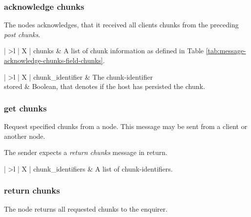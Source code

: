 \subsubsection{acknowledge chunks}
The \glspl{node} acknowledges, that it received all \glspl{client} \glspl{chunk} from the preceding \emph{post chunks}.

\begin{table}[h!]
    \begin{tabu}{| >{\ttfamily}l | X |}
        chunks
            & A list of \gls{chunk} information as defined in Table \ref{tab:message-acknowledge-chunks-field-chunks}.
    \end{tabu}
    \caption[\emph{acknowledge chunks} Structure]{Structure of a \emph{acknowledge chunks} \Gls{message}.}
    \label{tab:message-acknowledge-chunks-states}
\end{table}

\begin{table}[h!]
    \begin{tabu}{| >{\ttfamily}l | X |}
        chunk\_identifier
            & The \gls{chunk-identifier} \\
        stored
            & Boolean, that denotes if the host has persisted the \gls{chunk}.
    \end{tabu}
    \caption[Field \texttt{chunks} Structure]{Structure of Field \texttt{chunks} as Used in the \emph{acknowledge chunks} \Gls{message}.}
    \label{tab:message-acknowledge-chunks-field-chunks}
\end{table}

\subsubsection{get chunks}
Request specified \glspl{chunk} from a \gls{node}. This \gls{message} may be sent from a \gls{client} or another \gls{node}.

The sender expects a \emph{return chunks} \gls{message} in return.

\begin{table}[h!]
    \begin{tabu}{| >{\ttfamily}l | X |}
        chunk\_identifiers
            & A list of \glspl{chunk-identifier}.
    \end{tabu}
    \caption[\emph{get chunks} Structure]{Structure of a \emph{get chunks} \Gls{message}.}
    \label{tab:message-get-chunks}
\end{table}

\subsubsection{return chunks}
The \gls{node} returns all requested \glspl{chunk} to the enquirer.

